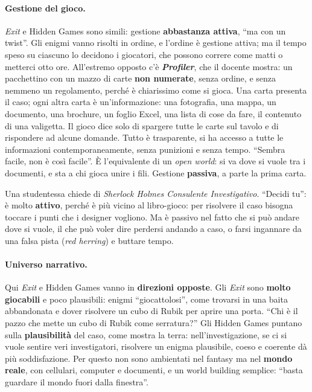 \paragraph{Gestione del gioco.} \emph{Exit} e Hidden Games sono simili: gestione
\textbf{abbastanza attiva}, ``ma con un twist''. Gli enigmi vanno risolti in
ordine, e l'ordine è gestione attiva; ma il tempo speso su ciascuno lo decidono i
giocatori, che possono correre come matti o metterci otto ore. All'estremo
opposto c'è \textbf{\emph{Profiler}}, che il docente mostra: un pacchettino con un
mazzo di carte \textbf{non numerate}, senza ordine, e senza nemmeno un
regolamento, perché è chiarissimo come si gioca. Una carta presenta il caso; ogni
altra carta è un'informazione: una fotografia, una mappa, un documento, una
brochure, un foglio Excel, una lista di cose da fare, il contenuto di una
valigetta. Il gioco dice solo di spargere tutte le carte sul tavolo e di
rispondere ad alcune domande. Tutto è trasparente, si ha accesso a tutte le
informazioni contemporaneamente, senza punizioni e senza tempo. ``Sembra facile,
non è così facile''. È l'equivalente di un \emph{open world}: si va dove si vuole
tra i documenti, e sta a chi gioca unire i fili. Gestione \textbf{passiva}, a
parte la prima carta.

Una studentessa chiede di \emph{Sherlock Holmes Consulente Investigativo}. ``Decidi
tu'': è molto \textbf{attivo}, perché è più vicino al libro-gioco: per risolvere il
caso bisogna toccare i punti che i designer vogliono. Ma è passivo nel fatto che
si può andare dove si vuole, il che può voler dire perdersi andando a caso, o
farsi ingannare da una falsa pista (\emph{red herring}) e buttare tempo.

\paragraph{Universo narrativo.} Qui \emph{Exit} e Hidden Games vanno in
\textbf{direzioni opposte}. Gli \emph{Exit} sono \textbf{molto giocabili} e poco
plausibili: enigmi ``giocattolosi'', come trovarsi in una baita abbandonata e
dover risolvere un cubo di Rubik per aprire una porta. ``Chi è il pazzo che mette
un cubo di Rubik come serratura?'' Gli Hidden Games puntano sulla
\textbf{plausibilità} del caso, come mostra la terra: nell'investigazione, se ci
si vuole sentire veri investigatori, risolvere un enigma plausibile, coeso e
coerente dà più soddisfazione. Per questo non sono ambientati nel fantasy ma nel
\textbf{mondo reale}, con cellulari, computer e documenti, e un world building
semplice: ``basta guardare il mondo fuori dalla finestra''.

